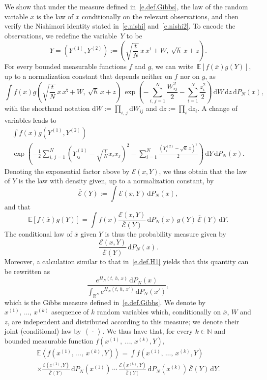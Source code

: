 \documentclass[AHL,Unicode,longabstracts,published]{cedram}
\newcommand{\N}{\mathbb{N}}
\newcommand{\R}{\mathbb{R}}
\newcommand{\E}{\mathbb{E}}
\renewcommand{\d}{\mathrm{d}}
\renewcommand{\t}{\mathsf{t}}
\newcommand{\1}{\mathds{1}}
\newcommand{\mclE}{\mathcal{E}}
\newcommand{\la}{\left\langle}
\newcommand{\ra}{\right\rangle}
\renewcommand{\bar}{\overline}
\begin{document}
We show that under the measure defined in~\eqref{e.def.Gibbs}, the law of the random variable $x$ is the law of $\bar x$ conditionally on the relevant observations, and then verify the Nishimori identity stated in~\eqref{e.nishi} and~\eqref{e.nishi2}. To encode the observations, we redefine the variable~$Y$ to be
\[
Y = \left(Y^{(1)},Y^{(2)}\right) := \left(\sqrt{\frac{t}{N}} \, \bar x \, \bar x^\t + W, \ \sqrt{h} \, \bar x + z\right).
\]
For every bounded measurable functions $f$ and $g$, we can write~$\E \left[f(\bar x) g(Y) \right]$, up to a normalization constant that depends neither on $f$ nor on $g$, as
\[
\int f(x) g \left(\sqrt{\frac{t}{N}} \, x \, x^\t + W, \ \sqrt{h} \, x + z \right) \, \exp \left(- \sum_{i,\,j = 1}^N \frac{W_{ij}^2}2 - \sum_{i = 1}^N \frac{z_i^2}{2} \right) \, \d W \, \d z \, \d P_N(x),
\]with the shorthand notation $\d W := \prod_{i,\,j} \d W_{ij}$ and $\d z := \prod_i \d z_i$. A change of variables leads to
\begin{multline*}
\int f(x) g(Y^{(1)},Y^{(2)}) \\
\exp \left(-\frac 1 2 \sum_{i,\,j = 1}^N \left(Y^{(1)}_{ij} - \sqrt{\frac t N} x_i x_j \right)^2 - \sum_{i= 1}^N \frac{(Y^{(2)}_i - \sqrt{h} \, x)^2}{2} \right) \, \d Y \, \d P_N(x).
\end{multline*}
Denoting the exponential factor above by $\mclE(x,Y)$, we thus obtain that the law of $Y$ is the law with density given, up to a normalization constant, by
\[
\bar {\mclE}(Y) := \int \mclE(x,Y) \, \d P_N(x),
\]
and that
\begin{equation}\label{e.joint.law}
\E \left[f(\bar x) g(Y) \right] = \int f(x) \frac{\mclE(x,Y)}{\bar {\mclE}(Y)} \, \d P_N(x) \, g(Y) \, \bar {\mclE}(Y) \, \d Y.
\end{equation}
The conditional law of $\bar x$ given $Y$ is thus the probability measure given by
\[
\frac{\mclE(x,Y)}{\bar{\mclE}(Y)} \, \d P_N(x).
\]
Moreover, a calculation similar to that in~\eqref{e.def.H1} yields that this quantity can be rewritten as
\[
\frac{e^{H_N(t,\,h,\,x)} \, \d P_N(x)}{\int_{\R^N} e^{H_N(t,\,h,\,x')} \, \d P_N(x')},
\]
which is the Gibbs measure defined in~\eqref{e.def.Gibbs}. We denote by $x^{(1)},\,\ldots,\,x^{(k)}$ a\linebreak sequence of $k$ random variables which, conditionally on $\bar x$, $W$ and $z$, are independent and distributed according to this measure; we denote their joint (conditional) law by $\la\,\cdot\,\ra$. We thus have that, for every $k \in \N$ and bounded measurable function $f (x^{(1)},\,\ldots,\,x^{(k)},Y)$,
\begin{multline*}
\E \la f\left(x^{(1)},\,\ldots,\,x^{(k)},Y\right) \ra =
\int f\left(x^{(1)},\,\ldots,\,x^{(k)},Y\right) \\
\times \frac{\mclE\left(x^{(1)},Y\right)}{\bar{\mclE}(Y)} \, \d P_N\left(x^{(1)}\right) \, \cdots \,\frac{\mclE\left(x^{(k)},Y\right)}{\bar{\mclE}(Y)} \, \d P_N\left(x^{(k)}\right) \, \bar{\mclE}(Y) \, \d Y.
\end{multline*}
\end{document}
